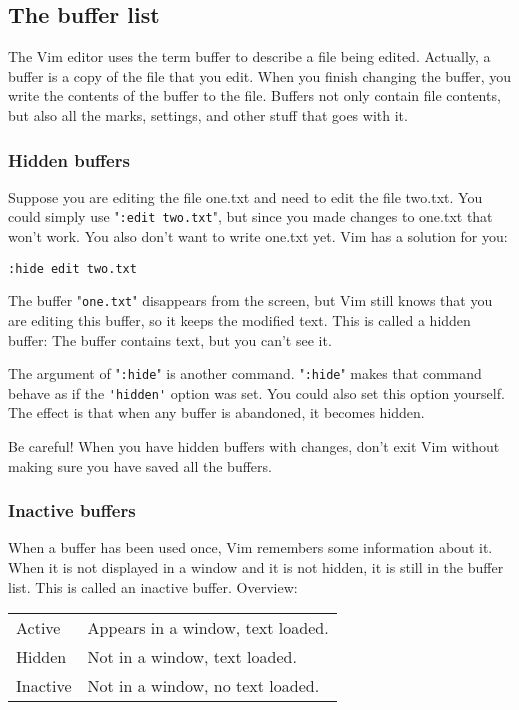 \subsection{The buffer list}
\label{The buffer list}
The Vim editor uses the term buffer to describe a file being edited.
Actually, a buffer is a copy of the file that you edit.
When you finish changing the buffer, you write the contents of the buffer to the file.
Buffers not only contain file contents, but also all the marks, settings, and other stuff that goes with it.
\subsubsection{Hidden buffers}
Suppose you are editing the file one.txt and need to edit the file two.txt.
You could simply use "\verb!:edit two.txt!", but since you made changes to one.txt that won't work.
You also don't want to write one.txt yet.
Vim has a solution for you:

\begin{Verbatim}[samepage=true]
 :hide edit two.txt
\end{Verbatim}

The buffer "\verb!one.txt!" disappears from the screen, but Vim still knows that you are editing this buffer, so it keeps the modified text.
This is called a hidden buffer: The buffer contains text, but you can't see it.

The argument of "\verb!:hide!" is another command.
"\verb!:hide!" makes that command behave as if the \verb!'hidden'! option was set.
You could also set this option yourself.
The effect is that when any buffer is abandoned, it becomes hidden.

Be careful!  When you have hidden buffers with changes, don't exit Vim without making sure you have saved all the buffers.
\subsubsection{Inactive buffers}
When a buffer has been used once, Vim remembers some information about it.
When it is not displayed in a window and it is not hidden, it is still in the buffer list.
This is called an inactive buffer.
Overview:

\begin{center} \begin{tabular}{l l}
				Active & Appears in a window, text loaded. \\
				Hidden & Not in a window, text loaded. \\
				Inactive & Not in a window, no text loaded. \\
\end{tabular} \end{center}

